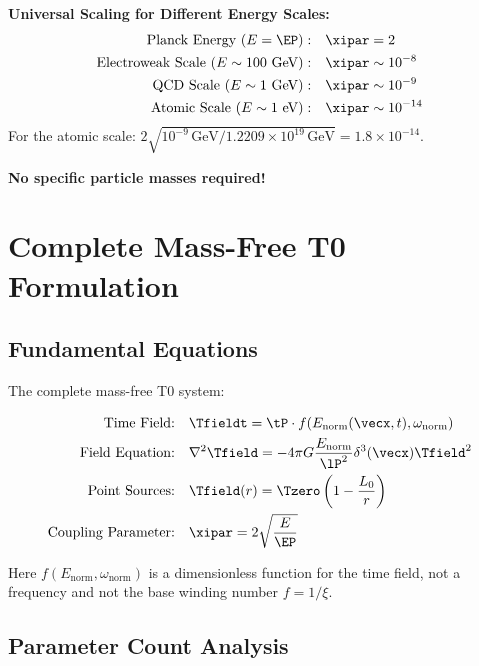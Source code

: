 	\textbf{Universal Scaling for Different Energy Scales:}
	\begin{align}
		\text{Planck Energy } (E = \EP): \quad &\xipar = 2 \\
		\text{Electroweak Scale } (E \sim 100 \text{ GeV}): \quad &\xipar \sim 10^{-8} \\
		\text{QCD Scale } (E \sim 1 \text{ GeV}): \quad &\xipar \sim 10^{-9} \\
		\text{Atomic Scale } (E \sim 1 \text{ eV}): \quad &\xipar \sim 10^{-14}
	\end{align}
	For the atomic scale: $2\sqrt{10^{-9}\,\text{GeV}/1.2209\times10^{19}\,\text{GeV}}=1.8\times10^{-14}$.
	
	\textbf{No specific particle masses required!}
	
	\section{Complete Mass-Free T0 Formulation}
	\label{sec:complete_formulation}
	
	\subsection{Fundamental Equations}
	\label{subsec:fundamental_equations}
	
	The complete mass-free T0 system:
	
	\begin{tcolorbox}[colback=blue!5!white,colframe=blue!75!black,title=Mass-Free T0 Model]
		\begin{align}
			\text{Time Field:} \quad &\Tfieldt = \tP \cdot f(E_{\text{norm}}(\vecx,t), \omega_{\text{norm}}) \\
			\text{Field Equation:} \quad &\nabla^2 \Tfield = -4\pi G \frac{E_{\text{norm}}}{\lP^2} \delta^3(\vecx) \Tfield^2 \\
			\text{Point Sources:} \quad &\Tfield(r) = \Tzero\left(1 - \frac{L_0}{r}\right) \\
			\text{Coupling Parameter:} \quad &\xipar = 2\sqrt{\frac{E}{\EP}}
		\end{align}
	\end{tcolorbox}

Here $f(E_{\text{norm}}, \omega_{\text{norm}})$ is a dimensionless function for the time field, not a frequency and not the base winding number $f = 1/\xi$.

	\subsection{Parameter Count Analysis}
	\label{subsec:parameter_count}
	

